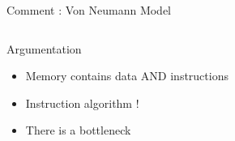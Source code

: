 \begin{Frame}{Comment :  Von Neumann Model}
  \begin{columns}[t]
    \begin{column}{\BW}
      \begin{block}{Argumentation}
        \begin{itemize}
        \item Memory contains data AND instructions
        \item Instruction algorithm !
        \item There is a bottleneck
        \end{itemize}
      \end{block}
      
    \end{column}
    \begin{column}{\BW}
      \begin{block}{}
      \end{block}
    \end{column}
  \end{columns}
\end{Frame}

